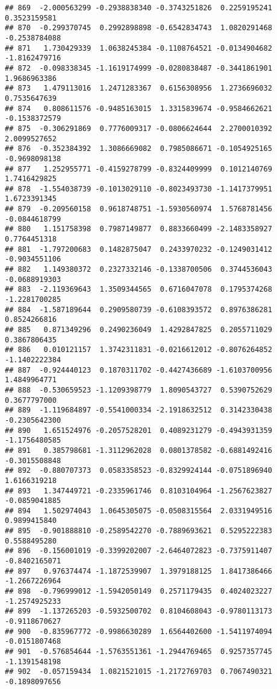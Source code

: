 \documentclass[
]{article}
\begin{document}
\begin{verbatim}
## 869  -2.000563299 -0.2938838340 -0.3743251826  0.2259195241  0.3523159581
## 870  -0.299370745  0.2992898898 -0.6542834743  1.0820291468 -0.2538784088
## 871   1.730429339  1.0638245384 -0.1108764521 -0.0134904682 -1.8162479716
## 872  -0.098338345 -1.1619174999 -0.0280838487 -0.3441861901  1.9686963386
## 873   1.479113016  1.2471283367  0.6156308956  1.2736696032  0.7535647639
## 874   0.808611576 -0.9485163015  1.3315839674 -0.9584662621 -0.1538372579
## 875  -0.306291869  0.7776009317 -0.0806624644  2.2700010392  2.0099527652
## 876  -0.352384392  1.3086669082  0.7985086671 -0.1054925165 -0.9698098138
## 877   1.252955771 -0.4159278799 -0.8324409999  0.1012140769  1.7416429825
## 878  -1.554038739 -0.1013029110 -0.8023493730 -1.1417379951  1.6723391345
## 879  -0.209560158  0.9618748751 -1.5930560974  1.5768781456 -0.0844618799
## 880   1.151758398  0.7987149877  0.8833660499 -2.1483358927  0.7764451318
## 881  -1.797200683  0.1482875047  0.2433970232 -0.1249031412 -0.9034551106
## 882   1.149380372  0.2327332146 -0.1338700506  0.3744536043 -0.0688919303
## 883  -2.119369643  1.3509344565  0.6716047078  0.1795374268 -1.2281700285
## 884  -1.587189644  0.2909580739 -0.6108393572  0.8976386281  0.8524266816
## 885   0.871349296  0.2490236049  1.4292847825  0.2055711029  0.3867806435
## 886   0.010121157  1.3742311831 -0.0216612012 -0.8076264852 -1.1402222384
## 887  -0.924440123  0.1870311702 -0.4427436689 -1.6103700956  1.4849964771
## 888  -0.530659523 -1.1209398779  1.8090543727  0.5390752629  0.3677797000
## 889  -1.119684897 -0.5541000334 -2.1918632512  0.3142330438 -0.2305642300
## 890   1.651524976 -0.2057528201  0.4089231279 -0.4943931359 -1.1756480585
## 891   0.385798681 -1.3112962028  0.0801378582 -0.6881492416 -0.3015508848
## 892  -0.880707373  0.0583358523 -0.8329924144 -0.0751896940  1.6166319218
## 893   1.347449721 -0.2335961746  0.8103104964 -1.2567623827 -0.0859041885
## 894   1.502974043  1.0645305075 -0.0508315564  2.0331949516  0.9899415840
## 895  -0.901888810 -0.2589542270 -0.7889693621  0.5295222383  0.5588495280
## 896  -0.156001019 -0.3399202007 -2.6464072823 -0.7375911407 -0.8402165071
## 897   0.976374474 -1.1872539907  1.3979188125  1.8417386466 -1.2667226964
## 898  -0.796999012 -1.5942050149  0.2571179435  0.4024023227 -1.2574925233
## 899  -1.137265203 -0.5932500702  0.8104608043 -0.9780113173 -0.9118670627
## 900  -0.835967772 -0.9986630289  1.6564402600 -1.5411974094 -0.0151807468
## 901  -0.576854644 -1.5763551361 -1.2944769465  0.9257357745 -1.1391548198
## 902  -0.057159434  1.0821521015 -1.2172769703  0.7067490321 -0.1898097656

\end{verbatim}
\end{document}
